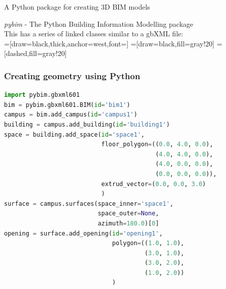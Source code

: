 \documentclass{beamer}
\begin{document}
	\begin{frame}{A Python package for creating 3D BIM models}
	
		\textit{pybim} - The Python Building Information Modelling package\\[10pt]
		
		This has a series of linked classes similar to a gbXML file:\\[10pt]
		
		=[draw=black,thick,anchor=west,font=\footnotesize]
		=[draw=black,fill=gray!20]
		=[dashed,fill=gray!20]
		
	\end{frame}



	
	\begin{frame}[fragile]
		\frametitle{Creating geometry using Python}
		\footnotesize
		\begin{lstlisting}[language=Python]
import pybim.gbxml601
bim = pybim.gbxml601.BIM(id='bim1')
campus = bim.add_campus(id='campus1')
building = campus.add_building(id='building1')
space = building.add_space(id='space1',
                           floor_polygon=((0.0, 4.0, 0.0),
                                          (4.0, 4.0, 0.0),
                                          (4.0, 0.0, 0.0),
                                          (0.0, 0.0, 0.0)),
                           extrud_vector=(0.0, 0.0, 3.0)
                           )
surface = campus.surfaces(space_inner='space1',
                          space_outer=None,
                          azimuth=180.0)[0]
opening = surface.add_opening(id='opening1',
                              polygon=((1.0, 1.0),
                                       (3.0, 1.0),
                                       (3.0, 2.0),
                                       (1.0, 2.0))
                              )
		\end{lstlisting}
	\end{frame}
\end{document}

